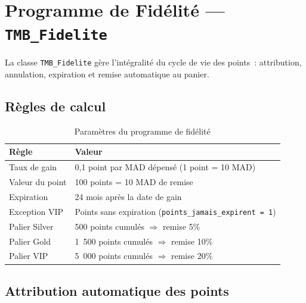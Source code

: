 \documentclass[12pt,a4paper]{report}
\begin{document}
\section{Programme de Fid\'elit\'e --- \texttt{TMB\_Fidelite}}

La classe \texttt{TMB\_Fidelite} g\`ere l'int\'egralit\'e du cycle de vie des points~:
attribution, annulation, expiration et remise automatique au panier.

\subsection{R\`egles de calcul}

\begin{table}[H]
\centering
\caption{Param\`etres du programme de fid\'elit\'e}
\begin{tabularx}{\linewidth}{lX}
  \toprule
  \textbf{R\`egle} & \textbf{Valeur} \\
  \midrule
  Taux de gain     & 0,1 point par MAD d\'epens\'e (1 point = 10 MAD) \\
  Valeur du point  & 100 points = 10 MAD de remise \\
  Expiration       & 24 mois apr\`es la date de gain \\
  Exception VIP    & Points sans expiration (\texttt{points\_jamais\_expirent = 1}) \\
  Palier Silver    & 500 points cumul\'es $\Rightarrow$ remise 5\% \\
  Palier Gold      & 1~500 points cumul\'es $\Rightarrow$ remise 10\% \\
  Palier VIP       & 5~000 points cumul\'es $\Rightarrow$ remise 20\% \\
  \bottomrule
\end{tabularx}
\end{table}

\subsection{Attribution automatique des points}

\end{document}
